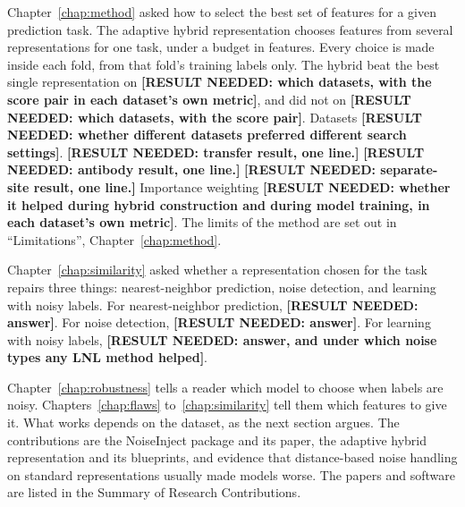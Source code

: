 Chapter~\ref{chap:method} asked how to select the best set of features for a given prediction task. The adaptive hybrid representation chooses features from several representations for one task, under a budget in features. Every choice is made inside each fold, from that fold's training labels only. The hybrid beat the best single representation on \textbf{[RESULT NEEDED: which datasets, with the score pair in each dataset's own metric]}, and did not on \textbf{[RESULT NEEDED: which datasets, with the score pair]}. Datasets \textbf{[RESULT NEEDED: whether different datasets preferred different search settings]}. \textbf{[RESULT NEEDED: transfer result, one line.]} \textbf{[RESULT NEEDED: antibody result, one line.]} \textbf{[RESULT NEEDED: separate-site result, one line.]} Importance weighting \textbf{[RESULT NEEDED: whether it helped during hybrid construction and during model training, in each dataset's own metric]}. The limits of the method are set out in ``Limitations'', Chapter~\ref{chap:method}.

Chapter~\ref{chap:similarity} asked whether a representation chosen for the task repairs three things: nearest-neighbor prediction, noise detection, and learning with noisy labels. For nearest-neighbor prediction, \textbf{[RESULT NEEDED: answer]}. For noise detection, \textbf{[RESULT NEEDED: answer]}. For learning with noisy labels, \textbf{[RESULT NEEDED: answer, and under which noise types any LNL method helped]}.

Chapter~\ref{chap:robustness} tells a reader which model to choose when labels are noisy. Chapters~\ref{chap:flaws} to~\ref{chap:similarity} tell them which features to give it. What works depends on the dataset, as the next section argues. The contributions are the NoiseInject package and its paper, the adaptive hybrid representation and its blueprints, and evidence that distance-based noise handling on standard representations usually made models worse. The papers and software are listed in the Summary of Research Contributions.




